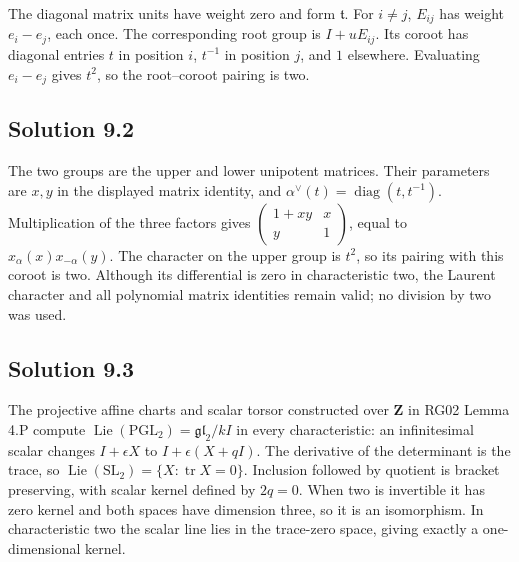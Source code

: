 \documentclass[11pt,a4paper,openany]{report}
\begin{document}
The diagonal matrix units have weight zero and form \(\mathfrak t\). For \(i\ne j\), \(E_{ij}\) has weight \(e_i-e_j\), each once. The corresponding root group is \(I+uE_{ij}\). Its coroot has diagonal entries \(t\) in position \(i\), \(t^{-1}\) in position \(j\), and \(1\) elsewhere. Evaluating \(e_i-e_j\) gives \(t^2\), so the root--coroot pairing is two.

\subsection{Solution 9.2}\label{AG-RG-03-solution-9.2}

The two groups are the upper and lower unipotent matrices. Their parameters are \(x,y\) in the displayed matrix identity, and \(\alpha^\vee(t)=\operatorname{diag}(t,t^{-1})\). Multiplication of the three factors gives \(\begin{pmatrix}1+xy&x\\y&1\end{pmatrix}\), equal to \(x_\alpha(x)x_{-\alpha}(y)\). The character on the upper group is \(t^2\), so its pairing with this coroot is two. Although its differential is zero in characteristic two, the Laurent character and all polynomial matrix identities remain valid; no division by two was used.

\subsection{Solution 9.3}\label{AG-RG-03-solution-9.3}

The projective affine charts and scalar torsor constructed over \(\mathbf Z\) in RG02 Lemma 4.P compute \(\operatorname{Lie}(\mathrm{PGL}_2)=\mathfrak{gl}_2/kI\) in every characteristic: an infinitesimal scalar changes \(I+\epsilon X\) to \(I+\epsilon(X+qI)\). The derivative of the determinant is the trace, so \(\operatorname{Lie}(\mathrm{SL}_2)=\{X:\operatorname{tr}X=0\}\). Inclusion followed by quotient is bracket preserving, with scalar kernel defined by \(2q=0\). When two is invertible it has zero kernel and both spaces have dimension three, so it is an isomorphism. In characteristic two the scalar line lies in the trace-zero space, giving exactly a one-dimensional kernel.
\end{document}
